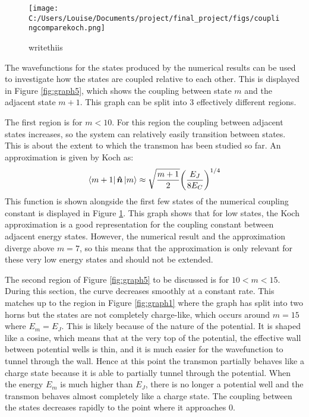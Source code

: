 \documentclass[11pt]{article}
\begin{document}
\begin{figure}[ht]
\centering
\texttt{[image: C:/Users/Louise/Documents/project/final\_project/figs/couplingcomparekoch.png]}
\caption{writethiis}
\label{fig:graph7}
\end{figure}
The wavefunctions for the states produced by the numerical results can be used to investigate how the states are coupled relative to each other. This is displayed in Figure \ref{fig:graph5}, which shows the coupling between state $m$ and the adjacent state $m+1$. This graph can be split into 3 effectively different regions.

 The first region is for $m<10$. For this region the coupling between adjacent states increases, so the system can relatively easily transition between states. This is about the extent to which the transmon has been studied so far. An approximation is given by Koch as:
\begin{equation} \label{eq:10}
\bra{m+1}\boldsymbol{\hat{n}}\ket{m} \approx \sqrt{\frac{m+1}{2}} \bigg( \frac{E_J}{8E_C}\bigg)^{1/4}
\end{equation}
This function is shown alongside the first few states of the numerical coupling constant is displayed in Figure \ref{fig:graph7}. This graph shows that for low states, the Koch approximation is a good representation for the coupling constant between adjacent energy states. However, the numerical result and the approximation diverge above $m=7$, so this means that the approximation is only relevant for these very low energy states and should not be extended.

The second region of Figure \ref{fig:graph5} to be discussed is for $10<m<15$. During this section, the curve decreases smoothly at a constant rate. This matches up to the region in Figure \ref{fig:graph1} where the graph has split into two horns but the states are not completely charge-like, which occurs around $m=15$ where $E_m = E_J$. This is likely because of the nature of the potential. It is shaped like a cosine, which means that at the very top of the potential, the effective wall between potential wells is thin, and it is much easier for the wavefunction to tunnel through the wall. Hence at this point the transmon partially behaves like a charge state because it is able to partially tunnel through the potential. When the energy $E_m$ is much higher than $E_J$, there is no longer a potential well and the transmon behaves almost completely like a charge state. The coupling between the states decreases rapidly to the point where it approaches 0.
\end{document}
